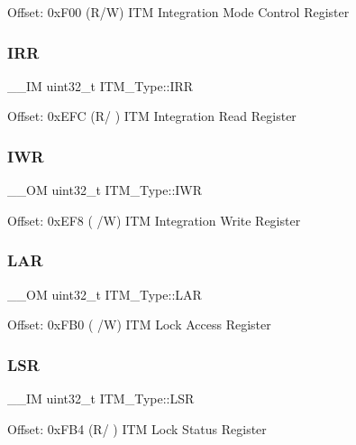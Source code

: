 Offset\+: 0x\+F00 (R/W) I\+TM Integration Mode Control Register \mbox{\label{structITM__Type_a66eb82a070953f09909f39b8e516fb91}} 
\subsubsection{\texorpdfstring{IRR}{IRR}}
{\footnotesize\ttfamily \+\_\+\+\_\+\+IM uint32\+\_\+t I\+T\+M\+\_\+\+Type\+::\+I\+RR}

Offset\+: 0x\+E\+FC (R/ ) I\+TM Integration Read Register \mbox{\label{structITM__Type_aa9da04891e48d1a2f054de186e9c4c94}} 
\subsubsection{\texorpdfstring{IWR}{IWR}}
{\footnotesize\ttfamily \+\_\+\+\_\+\+OM uint32\+\_\+t I\+T\+M\+\_\+\+Type\+::\+I\+WR}

Offset\+: 0x\+E\+F8 ( /W) I\+TM Integration Write Register \mbox{\label{structITM__Type_a7f9c2a2113a11c7f3e98915f95b669d5}} 
\subsubsection{\texorpdfstring{LAR}{LAR}}
{\footnotesize\ttfamily \+\_\+\+\_\+\+OM uint32\+\_\+t I\+T\+M\+\_\+\+Type\+::\+L\+AR}

Offset\+: 0x\+F\+B0 ( /W) I\+TM Lock Access Register \mbox{\label{structITM__Type_a3861c67933a24dd6632288c4ed0b80c8}} 
\subsubsection{\texorpdfstring{LSR}{LSR}}
{\footnotesize\ttfamily \+\_\+\+\_\+\+IM uint32\+\_\+t I\+T\+M\+\_\+\+Type\+::\+L\+SR}

Offset\+: 0x\+F\+B4 (R/ ) I\+TM Lock Status Register \mbox{\label{structITM__Type_ab4a4cc97ad658e9c46cf17490daffb8a}} 
